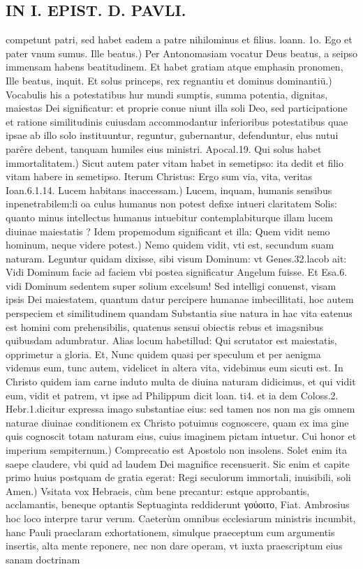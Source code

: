 \documentclass{article}
\begin{document}
\begin{pages}
\section*{IN I. EPIST. D. PAVLI. }
\marginpar{[ p.131 ]}\pstart competunt patri, sed habet eadem a patre nihilominus et filius. loann. 1o. Ego et pater vnum sumus.  \pend\pstart Ille beatus.) Per Antonomasiam vocatur Deus beatus, a seipso immensam habens beatitudinem. Et habet gratiam atque emphasin pronomen, Ille beatus, inquit.  \pend\pstart Et solus princeps, rex regnantiu et dominus dominantiü.) Vocabulis his a potestatibus hur mundi sumptis, summa potentia, dignitas, maiestas Dei significatur: et proprie conue niunt illa soli Deo, sed participatione et ratione similitudinis cuiusdam accommodantur inferioribus potestatibus quae ipsae ab illo solo instituuntur, reguntur, gubernantur, defenduntur, elus nutui parêre debent, tanquam humiles eius ministri. Apocal.19.  \pend\pstart Qui solus habet immortalitatem.) Sicut autem pater vitam habet in semetipso: ita dedit et filio vitam habere in semetipso. Iterum Christus: Ergo sum via, vita, veritas Ioan.6.1.14.  \pend\pstart Lucem habitans inaccessam.) Lucem, inquam, humanis sensibus inpenetrabilem:li oa culus humanus non potest defixe intueri claritatem Solis: quanto minus intellectus humanus intuebitur contemplabiturque illam lucem diuinae maiestatis ? Idem propemodum significant et illa:  \pend\pstart Quem vidit nemo hominum, neque videre potest.) Nemo quidem vidit, vti est, secundum suam naturam. Leguntur quidam dixisse, sibi visum Dominum: vt Genes.32.lacob ait: Vidi Dominum facie ad faciem vbi postea significatur Angelum fuisse. Et Esa.6. vidi Dominum sedentem super solium excelsum! Sed intelligi conuenst, visam ipsis Dei maiestatem, quantum datur percipere humanae imbecillitati, hoc autem perspeciem et similitudinem quandam Substantia siue natura in hac vita eatenus est homini com prehensibilis, quatenus sensui obiectis rebus et imagsnibus quibusdam adumbratur. Alias locum habetillud: Qui scrutator est maiestatis, opprimetur a gloria. Et, Nunc quidem quasi per speculum et per aenigma videmus eum, tunc autem, videlicet in altera vita, videbimus eum sicuti est. In Christo quidem iam carne induto multa de diuina naturam didicimus, et qui vidit eum, vidit et patrem, vt ipse ad Philippum dicit loan. ti4. et ia dem Coloss.2. Hebr.1.dicitur expressa imago substantiae eius: sed tamen nos non ma gis omnem naturae diuinae conditionem ex Christo potuimus cognoscere, quam ex ima gine quis cognoscit totam naturam eius, cuius imaginem pictam intuetur.  \pend\pstart Cui honor et imperium sempiternum.) Comprecatio est Apostolo non insolens. Solet enim ita saepe claudere, vbi quid ad laudem Dei magnifice recensuerit. Sic enim et capite primo huius postquam de gratia egerat: Regi seculorum immortali, inuisibili, soli  \pend\pstart Amen.) Vsitata vox Hebraeis, cùm bene precantur: estque approbantis, acclamantis, beneque optantis Septuaginta reddiderunt γούοιτο, Fiat. Ambrosius hoc loco interpre tarur verum. Caeterùm omnibus ecclesiarum ministris incumbit, hanc Pauli praeclaram exhortationem, simulque praeceptum cum argumentis insertis, alta mente reponere, nec non dare operam, vt iuxta praescriptum eius sanam doctrinam 
\end{pages}
\end{document}
